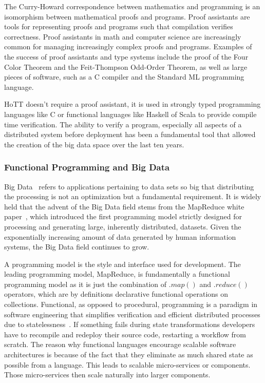 \documentclass[runningheads]{llncs}
\begin{document}
The Curry-Howard correspondence between mathematics and programming is an isomorphism between mathematical proofs and programs. Proof assistants are tools for representing proofs and programs such that compilation verifies correctness. Proof assistants in math and computer science are increasingly common for managing increasingly complex proofs and programs. Examples of the success of proof assistants and type systems include the proof of the Four Color Theorem and the Feit-Thompson Odd-Order Theorem, as well as large pieces of software, such as a C compiler and the Standard ML programming language.

HoTT doesn't require a proof assistant, it is used in strongly typed programming languages like C or functional languages like Haskell of Scala to provide compile time verification. The ability to verify a program, especially all aspects of a distributed system before deployment has been a fundamental tool that allowed the creation of the big data space over the last ten years.

\subsubsection{Functional Programming and Big Data}
Big Data~\cite{ref_article11,ref_book2} refers to applications pertaining to data sets so big that distributing the processing is not an optimization but a fundamental requirement. It is widely held that the advent of the Big Data field stems from the MapReduce white paper~\cite{ref_proc1}, which introduced the first programming model strictly designed for processing and generating large, inherently distributed, datasets. Given the exponentially increasing amount of data generated by human information systems, the Big Data field continues to grow.

A programming model is the style and interface used for development. The leading programming model, MapReduce, is fundamentally a functional programming model as it is just the combination of $.map()$ and $.reduce()$ operators, which are by definitions declarative functional operations on collections. Functional, as opposed to procedural, programming is a paradigm in software engineering that simplifies verification and efficient distributed processes due to statelessness~\cite{ref_book3}. If something fails during state transformations developers have to recompile and redeploy their source code, restarting a workflow from scratch. The reason why functional languages encourage scalable software architectures is because of the fact that they eliminate as much shared state as possible from a language. This leads to scalable micro-services or components. Those micro-services then scale naturally into larger components.
\end{document}
